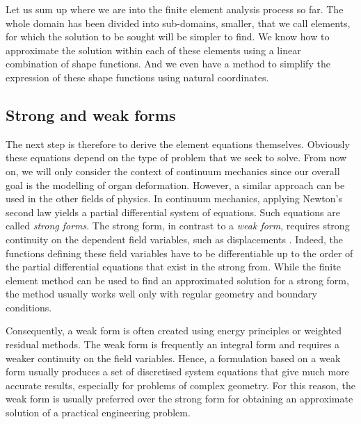 Let us sum up where we are into the finite element analysis process so far. The whole domain has been divided into sub-domains, smaller, that we call elements, for which the solution to be sought will be simpler to find. We know how to approximate the solution within each of these elements using a linear combination of shape functions. And we even have a method to simplify the expression of these shape functions using natural coordinates. 

	\subsection{Strong and weak forms}
	
The next step is therefore to derive the element equations themselves. Obviously these equations depend on the type of problem that we seek to solve. From now on, we will only consider the context of continuum mechanics since our overall goal is the modelling of organ deformation. However, a similar approach can be used in the other fields of physics. In continuum mechanics, applying Newton's second law yields a partial differential system of equations. Such equations are called \emph{strong forms}. The strong form, in contrast to a \emph{weak form}, requires strong continuity on the dependent field variables, such as displacements \citep{Liu03}. Indeed, the functions defining these field variables have to be differentiable up to the order of the partial differential equations that exist in the strong from. While the finite element method can be used to find an approximated solution for a strong form,  the method usually works well only with regular geometry and boundary conditions. 

Consequently, a weak form is often created using energy principles or weighted residual methods. The weak form is frequently an integral form and requires a weaker continuity on the field variables. Hence, a formulation based on a weak form usually produces a set of discretised system equations that give much more accurate results, especially for problems of complex geometry. For this reason, the weak form is usually preferred over the strong form for obtaining an approximate solution of a practical engineering problem. 

